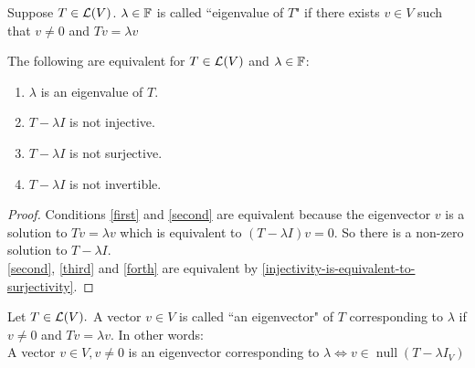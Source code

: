 \begin{mydef}
    Suppose $T\in \mathcal{L} (V)$. $\lambda \in \mathbb{F}$ is called ``eigenvalue of $T$" if there exists $v \in V$ such that $v \neq 0$ and $Tv = \lambda v$
\end{mydef}

\setcounter{thm}{6}
\begin{thm}
    \label{equivalent-conditions-to-be-an-eigenvalue}
    The following are equivalent for $T \in \mathcal{L}(V)$ and $\lambda \in \mathbb{F}$:
    \begin{enumerate}[label=(\alph*)]
        \item $\lambda$ is an eigenvalue of $T$. \label{first}
        \item $T-\lambda I$ is not injective. \label{second}
        \item $T-\lambda I$ is not surjective. \label{third}
        \item $T-\lambda I$ is not invertible. \label{forth}
    \end{enumerate}
\end{thm}
\begin{proof}
    Conditions \ref{first} and \ref{second} are equivalent because the eigenvector $v$ is a solution to $Tv=\lambda v$ which is equivalent to $(T-\lambda I)v=0$. So there is a non-zero solution to $T-\lambda I$. \\
    \ref{second}, \ref{third} and \ref{forth} are equivalent by \ref{injectivity-is-equivalent-to-surjectivity}.
    
\end{proof}

\setcounter{thm}{7}
\begin{thm}
    Let $T\in \mathcal{L}(V).$ A vector $v \in V$ is called ``an eigenvector" of $T$ corresponding to $\lambda$ if $v\neq 0$ and $Tv = \lambda v$.
    In other words: 
    \\A vector $v\in V, v \neq 0$ is an eigenvector corresponding to $\lambda \iff v \in \operatorname{null}(T-\lambda I_V)$
\end{thm}

